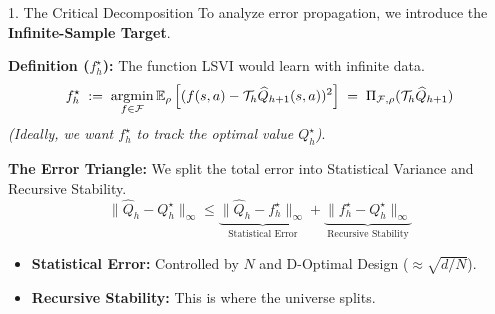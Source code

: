 \documentclass[aspectratio=169]{beamer}
\begin{document}
\begin{frame}{1. The Critical Decomposition}
    To analyze error propagation, we introduce the \textbf{Infinite-Sample Target}.
    
    \vspace{0.2cm}
    
    \textbf{Definition ($f^\star_h$):} The function LSVI would learn with infinite data.
    \[
    f^\star_h \;:=\; \operatorname*{argmin}_{f \in \mathcal{F}} \mathbb{E}_{\rho} \left[ (f(s,a) - \mathcal{T}_h \widehat{Q}_{h+1}(s,a))^2 \right] \;=\; \Pi_{\mathcal{F}, \rho} ( \mathcal{T}_h \widehat{Q}_{h+1} )
    \]
    \emph{(Ideally, we want $f^\star_h$ to track the optimal value $Q^\star_h$)}.
    
    \vspace{0.3cm}
    
    \textbf{The Error Triangle:}
    We split the total error into Statistical Variance and Recursive Stability.
    \[
    \|\widehat{Q}_h - Q^\star_h\|_\infty \le \underbrace{\|\widehat{Q}_h - f^\star_h\|_\infty}_{\text{Statistical Error}} + \underbrace{\|f^\star_h - Q^\star_h\|_\infty}_{\text{Recursive Stability}}
    \]
   \begin{itemize}
        \item \textbf{Statistical Error:} Controlled by $N$ and D-Optimal Design ($\approx \sqrt{d/N}$).
        \item \textbf{Recursive Stability:} This is where the universe splits.
    \end{itemize}
\end{frame}
\end{document}
